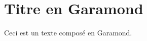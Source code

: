 \documentclass{scrartcl}
\begin{document}
\section{Titre en Garamond}
Ceci est un texte composé en Garamond.
\end{document}
